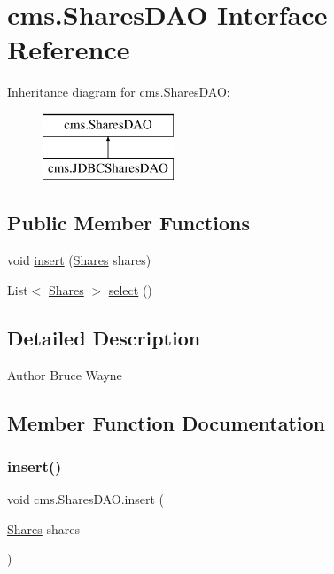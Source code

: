 \hypertarget{interfacecms_1_1_shares_d_a_o}{}\section{cms.\+Shares\+D\+AO Interface Reference}
\label{interfacecms_1_1_shares_d_a_o}
Inheritance diagram for cms.\+Shares\+D\+AO\+:\begin{figure}[H]
\begin{center}
\leavevmode
\includegraphics[height=2.000000cm]{interfacecms_1_1_shares_d_a_o}
\end{center}
\end{figure}
\subsection*{Public Member Functions}
\begin{DoxyCompactItemize}
\item 
void \mbox{\hyperlink{interfacecms_1_1_shares_d_a_o_aa2eeea0c51b4883c652c5aa396f0d316}{insert}} (\mbox{\hyperlink{classcms_1_1_shares}{Shares}} shares)
\item 
List$<$ \mbox{\hyperlink{classcms_1_1_shares}{Shares}} $>$ \mbox{\hyperlink{interfacecms_1_1_shares_d_a_o_ae7aa2a885c92a0d965d434e090d248ee}{select}} ()
\end{DoxyCompactItemize}


\subsection{Detailed Description}
\begin{DoxyAuthor}{Author}
Bruce Wayne 
\end{DoxyAuthor}


\subsection{Member Function Documentation}
\mbox{\label{interfacecms_1_1_shares_d_a_o_aa2eeea0c51b4883c652c5aa396f0d316}} 
\subsubsection{\texorpdfstring{insert()}{insert()}}
{\footnotesize\ttfamily void cms.\+Shares\+D\+A\+O.\+insert (\begin{DoxyParamCaption}\item[{\mbox{\hyperlink{classcms_1_1_shares}{Shares}}}]{shares }\end{DoxyParamCaption})}



